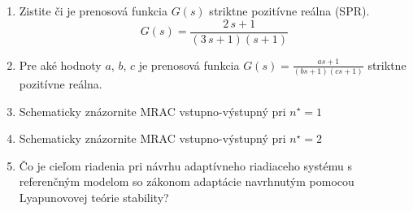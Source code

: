 ﻿\documentclass[a4paper, 10pt, ]{article}
\begin{document}
\begin{enumerate}


	\item Zistite či je prenosová funkcia $G(s)$ striktne pozitívne reálna (SPR).
	\begin{equation*}
		G(s) = \frac{2\,s + 1}{ (3\,s + 1) (s + 1)}
	\end{equation*}


	\item Pre aké hodnoty $a$, $b$, $c$ je prenosová funkcia $\displaystyle G(s) = \frac{as + 1}{ \left( bs + 1 \right)   \left( cs + 1 \right)   }$ striktne pozitívne reálna.


	\item Schematicky znázornite MRAC vstupno-výstupný pri $n^\star = 1$

	\item Schematicky znázornite MRAC vstupno-výstupný pri $n^\star = 2$

	\item Čo je cieľom riadenia pri návrhu adaptívneho riadiaceho systému s referenčným modelom so zákonom adaptácie navrhnutým pomocou Lyapunovovej teórie stability?



\end{enumerate}
\end{document}
